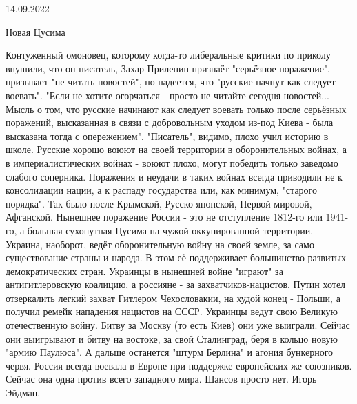 14.09.2022

Новая Цусима

Контуженный омоновец, которому когда-то либеральные критики по приколу внушили, что он писатель, Захар Прилепин признаёт "серьёзное поражение", призывает "не читать новостей", но надеется, что "русские начнут как следует воевать".
"Если не хотите огорчаться - просто не читайте сегодня новостей...
Мысль о том, что русские начинают как следует воевать только после серьёзных поражений, высказанная в связи с добровольным уходом из-под Киева - была высказана тогда с опережением".
"Писатель", видимо, плохо учил историю в школе. Русские хорошо воюют на своей территории в оборонительных войнах, а в империалистических войнах - воюют плохо, могут победить только заведомо слабого соперника. Поражения и неудачи в таких войнах всегда приводили не к консолидации нации, а к распаду государства или, как минимум, "старого порядка". Так было после Крымской, Русско-японской, Первой мировой, Афганской. Нынешнее поражение России - это не отступление 1812-го или 1941-го, а большая сухопутная Цусима на чужой оккупированной территории.
Украина, наоборот, ведёт оборонительную войну на своей земле, за само существование страны и народа. В этом её поддерживает большинство развитых демократических стран. Украинцы в нынешней войне "играют" за антигитлеровскую коалицию, а россияне - за захватчиков-нацистов.
Путин хотел отзеркалить легкий захват Гитлером Чехословакии, на худой конец - Польши, а получил ремейк нападения нацистов на СССР. Украинцы ведут свою Великую отечественную войну. Битву за Москву (то есть Киев) они уже выиграли. Сейчас они выигрывают и битву на востоке, за свой Сталинград, беря в кольцо новую "армию Паулюса". А дальше останется "штурм Берлина" и агония бункерного червя.
Россия всегда воевала в Европе при поддержке европейских же союзников. Сейчас она одна против всего западного мира. Шансов просто нет.
Игорь Эйдман.
